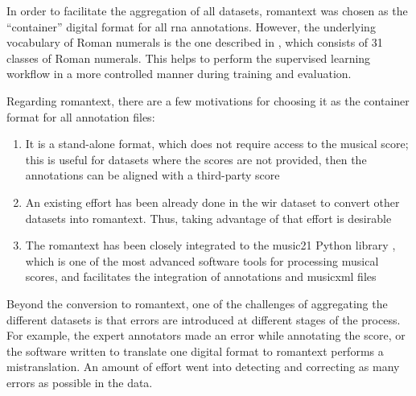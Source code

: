 
In order to facilitate the aggregation of all datasets,
\gls{romantext} was chosen as the ``container'' digital
format for all \gls{rna} annotations. However, the
underlying vocabulary of Roman numerals is the one described
in , which consists of
31 classes of Roman numerals. This helps to perform the
supervised learning workflow in a more controlled manner
during training and evaluation.

Regarding \gls{romantext}, there are a few motivations for
choosing it as the container format for all annotation
files:

\begin{enumerate} 
    \item It is a stand-alone format, which does not require
    access to the musical score; this is useful for datasets
    where the scores are not provided, then the annotations
    can be aligned with a third-party score
    \item An existing effort has been already done in the
    \gls{wir} dataset
    \parencite{gotham2019romantext, gotham2022openscore}
    to convert other datasets into \gls{romantext}. Thus,
    taking advantage of that effort is desirable 
    \item The \gls{romantext} has been closely integrated to
    the music21 Python library
    \parencite{cuthbert2010music21}, which is one of the
    most advanced software tools for processing musical
    scores, and facilitates the integration of annotations
    and \gls{musicxml} files 
\end{enumerate}

Beyond the conversion to \gls{romantext}, one of the
challenges of aggregating the different datasets is that
errors are introduced at different stages of the process.
For example, the expert annotators made an error while
annotating the score, or the software written to translate
one digital format to \gls{romantext} performs a
mistranslation. An amount of effort went into detecting and
correcting as many errors as possible in the data.


